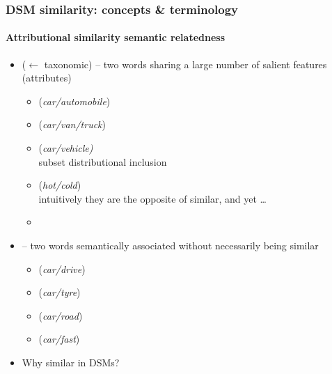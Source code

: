 \documentclass[t]{beamer} %
\begin{document}
\begin{frame}
  \frametitle{DSM similarity: concepts \& terminology}
  \framesubtitle{Attributional similarity \vs semantic relatedness}

  \ungap[1]
  \begin{itemize}
  \item {} ($\leftarrow$ taxonomic) -- two words sharing a large number of salient features (attributes)
    \begin{itemize}
    \item {} (\emph{car/automobile})
    \item {} (\emph{car/van/truck})
    \item {} (\emph{car/vehicle)}\\
      \hand{} subset \so distributional inclusion \citep{LenciBenotto:12}
    \item {} (\emph{hot/cold})\\
      \hand{} intuitively they are the opposite of similar, and yet \ldots
    \item[]
    \end{itemize}
  \item<2->  \citep{Budanitsky:Hirst:06} -- two words semantically associated without necessarily being similar
    \begin{itemize}
    \item {} (\emph{car/drive})
    \item {} (\emph{car/tyre})
    \item {} (\emph{car/road})
    \item {} (\emph{car/fast})
    \end{itemize}
  \item<2->[\hand] Why similar in DSMs? 
  \end{itemize}
\end{frame}
\end{document}
